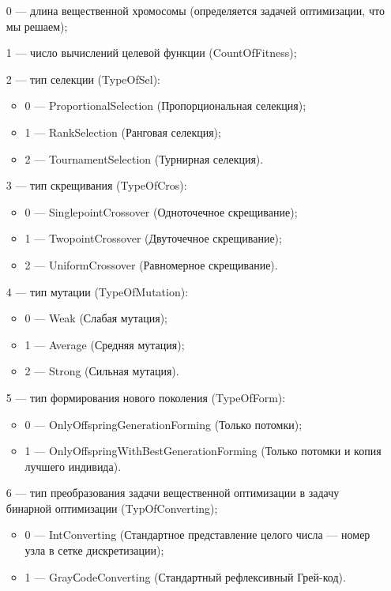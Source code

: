 \documentclass[a4paper,12pt]{article}
\begin{document}
 \begin{itemize}
 \item   [0] --- длина вещественной хромосомы (определяется задачей оптимизации, что мы решаем);
  \item   [1] --- число вычислений целевой функции (CountOfFitness);
  \item    [2] --- тип селекции (TypeOfSel):
 \begin{itemize}
       \item 0 --- ProportionalSelection (Пропорциональная селекция);
 
       \item 1 --- RankSelection (Ранговая селекция);
 
       \item 2 --- TournamentSelection (Турнирная селекция).
	    \end{itemize}
 
 \item [3] --- тип скрещивания (TypeOfCros):
  \begin{itemize}
       \item 0 --- SinglepointCrossover (Одноточечное скрещивание);
 
       \item 1 --- TwopointCrossover (Двуточечное скрещивание);
 
       \item 2 --- UniformCrossover (Равномерное скрещивание).
	    \end{itemize}
 
 \item [4] --- тип мутации (TypeOfMutation):
  \begin{itemize}
       \item 0 --- Weak (Слабая мутация);
 
       \item 1 --- Average (Средняя мутация);
 
       \item 2 --- Strong (Сильная мутация).
	    \end{itemize}
 
 \item [5] --- тип формирования нового поколения (TypeOfForm):
  \begin{itemize}
       \item 0 --- OnlyOffspringGenerationForming (Только потомки);
 
       \item 1 --- OnlyOffspringWithBestGenerationForming (Только потомки и копия лучшего индивида).
	    \end{itemize}
 \item [6] --- тип преобразования задачи вещественной оптимизации в задачу бинарной оптимизации (TypOfConverting);
   \begin{itemize}
        \item 0 --- IntConverting (Стандартное представление целого числа –-- номер узла в сетке дискретизации);
        \item 1 --- GrayСodeConverting (Стандартный рефлексивный Грей-код).
			    \end{itemize}
 \end{itemize}
 
\end{document}
